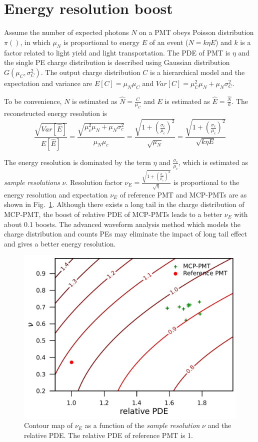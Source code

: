 \section{Energy resolution boost}
\label{Result}
Assume the number of expected photons $N$ on a PMT obeys Poisson distribution $\pi()$, in which $\mu_N$ is proportional to energy $E$ of an event ($N=k\eta E$) and $k$ is a factor related to light yield and light transportation. The PDE of PMT is $\eta$ and the single PE charge distribution is described using Gaussian distribution $G(\mu_C,\sigma_C^2)$. The output charge distribution $C$ is a hierarchical model and the expectation and variance are $E[C]=\mu_N\mu_C$ and $Var[C]=\mu_C^2\mu_N+\mu_N\sigma_C^2$.

To be convenience, $N$ is estimated as $\hat{N}=\frac{C}{\mu_C}$ and $E$ is estimated as $\hat{E}=\frac{\hat{N}}{k}$. The reconstructed energy resolution is 
\begin{equation}
    \frac{\sqrt{Var[\hat{E}]}}{E[\hat{E}]}=\frac{\sqrt{\mu_c^2\mu_N+\mu_N\sigma_c^2}}{\mu_N\mu_c}=\frac{\sqrt{1+(\frac{\sigma_c}{\mu_c})^2}}{\sqrt{\mu_N}}=\frac{\sqrt{1+(\frac{\sigma_c}{\mu_c})^2}}{\sqrt{k\eta E}}
\end{equation}

The energy resolution is dominated by the term $\eta$ and $\frac{\sigma_c}{\mu_c}$, which is estimated as \emph{sample resolutions} $\nu$. Resolution factor $\nu_{E}=\frac{\sqrt{1+(\frac{\sigma_c}{\mu_c})^2}}{\sqrt{\eta}}$ is proportional to the energy resolution and expectation $\nu_{E}$ of reference PMT and MCP-PMTs are as shown in Fig.~\ref{fig:EnergyResolution}. Although there exists a long tail in the charge distribution of MCP-PMT, the boost of relative PDE of MCP-PMTs leads to a better $\nu_{E}$ with about 0.1 boosts. The advanced waveform analysis method which models the charge distribution and counts PEs may eliminate the impact of long tail effect and gives a better energy resolution.
\begin{figure}[!htbp]
    \centering
    \includegraphics[width=\MF\textwidth]{figures/result/resolution.pdf}
    \caption{Contour map of $\nu_{E}$ as a function of the \emph{sample resolution} $\nu$ and the relative PDE. The relative PDE of reference PMT is 1.}
    \label{fig:EnergyResolution}
\end{figure}
